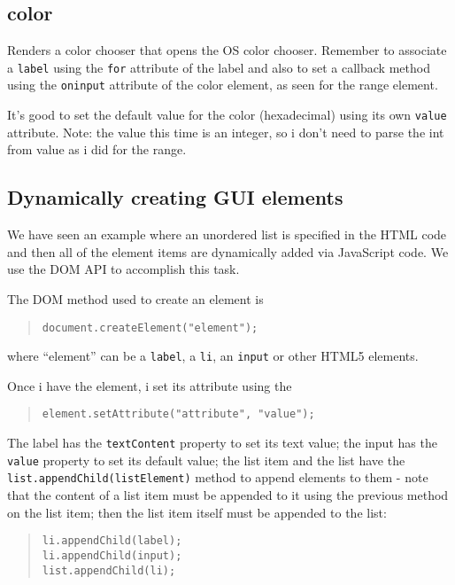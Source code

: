 \documentclass[a4paper,11pt]{book}
\begin{document}
\subsection{color}
Renders a color chooser that opens the OS color chooser. Remember to associate a \texttt{label} using the
\texttt{for} attribute of the label and also to set a callback method using the \texttt{oninput} attribute
of the color element, as seen for the range element.

It's good to set the default value for the color (hexadecimal) using its own
\texttt{value} attribute. Note: the value this time is an integer, so i don't
need to parse the int from value as i did for the range.

\subsection{Dynamically creating GUI elements}
We have seen an example where an unordered list is specified in the HTML code and then
all of the element items are dynamically added via JavaScript code. We use the DOM API
to accomplish this task.

The DOM method used to create an element is \\ 
\begin{verse}
\texttt{document.createElement("element");}
\end{verse}
where ``element'' can be a \texttt{label}, a \texttt{li}, an \texttt{input} or other
HTML5 elements.

Once i have the element, i set its attribute using the \\
\begin{verse}
\texttt{element.setAttribute("attribute", "value");}
\end{verse}

The label has the \texttt{textContent} property to set its text value;
the input has the \texttt{value} property to set its default value;
the list item and the list have the \texttt{list.appendChild(listElement)} method
to append elements to them - note that the content of a list item must
be appended to it using the previous method on the list item; then the
list item itself must be appended to the list:
\begin{verse}
\begin{verbatim}
li.appendChild(label);
li.appendChild(input);
list.appendChild(li);
\end{verbatim}
\end{verse}
\end{document}
